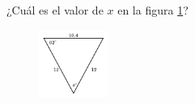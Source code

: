 \question[15]  ¿Cuál es el valor de $x$ en la figura \ref{fig:findangle02}?
\begin{figure}[H]
    \begin{center}
        \includegraphics[width=0.2\textwidth]{../images/findangle02.png}
    \end{center}
    \caption{}
    \label{fig:findangle02}
\end{figure}